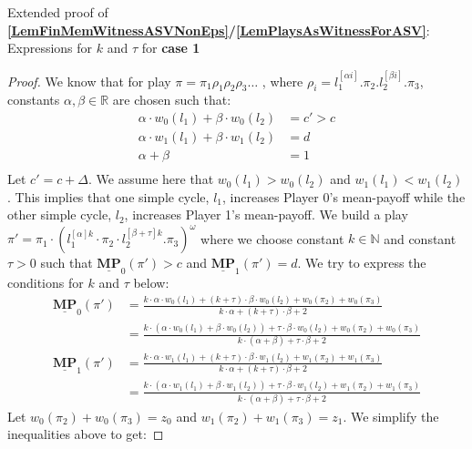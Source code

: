 \begin{lemma}
\label{LemExtProofOfFinMemforASV}
Extended proof of \textbf{\cref{LemFinMemWitnessASVNonEps}/\cref{LemPlaysAsWitnessForASV}}: Expressions for $k$ and $\tau$ for \textbf{case 1}
\end{lemma}
\begin{proof}
We know that for play $\pi = \pi_1\rho_1\rho_2\rho_3\dots$ , where $\rho_i = l_1^{[\alpha i]}.\pi_2.l_2^{[\beta i]}.\pi_3$, constants $\alpha, \beta \in \mathbb{R}$ are chosen such that: 
\begin{align*}
    \alpha \cdot w_0(l_1) + \beta \cdot w_0(l_2) &= c' > c \\
    \alpha \cdot w_1(l_1) + \beta \cdot w_1(l_2) &= d \\
    \alpha + \beta &= 1 \\
\end{align*}
Let $c' = c + \Delta$. We assume here that $w_0(l_1) > w_0(l_2)$ and $w_1(l_1) < w_1(l_2)$. This implies that one simple cycle, $l_1$, increases Player 0's mean-payoff while the other simple cycle, $l_2$, increases Player 1's mean-payoff. We build a play $\pi' = \pi_1 \cdot (l_1^{[\alpha]k} \cdot \pi_2 \cdot l_2^{[\beta+\tau]k}.\pi_3)^{\omega}$ where we choose constant $k \in \mathbb{N}$ and constant $\tau > 0$ such that $\underline{\mathbf{MP}}_0(\pi') > c$ and $\underline{\mathbf{MP}}_1(\pi') = d$. We try to express the conditions for $k$ and $\tau$ below:
\begin{align*}
    \underline{\mathbf{MP}}_0(\pi') &= \frac{k\cdot\alpha\cdot w_0(l_1) + (k + \tau) \cdot \beta \cdot w_0(l_2) + w_0(\pi_2) + w_0(\pi_3)}{k\cdot\alpha + (k+\tau)\cdot\beta + 2}\\
    &= \frac{k\cdot(\alpha\cdot w_0(l_1) + \beta \cdot w_0(l_2)) + \tau \cdot \beta \cdot w_0(l_2) + w_0(\pi_2) + w_0(\pi_3)}{k\cdot(\alpha + \beta) + \tau\cdot\beta + 2}\\
    \underline{\mathbf{MP}}_1(\pi') &= \frac{k\cdot\alpha\cdot w_1(l_1) + (k + \tau) \cdot \beta \cdot w_1(l_2) + w_1(\pi_2) + w_1(\pi_3)}{k\cdot\alpha + (k+\tau)\cdot\beta + 2}\\
    &= \frac{k\cdot(\alpha\cdot w_1(l_1) + \beta \cdot w_1(l_2)) + \tau \cdot \beta \cdot w_1(l_2) + w_1(\pi_2) + w_1(\pi_3)}{k\cdot(\alpha + \beta) + \tau\cdot\beta + 2}
\end{align*}
Let $w_0(\pi_2) + w_0(\pi_3) = z_0$ and $w_1(\pi_2) + w_1(\pi_3) = z_1$. We simplify the inequalities above to get:


\end{proof}
